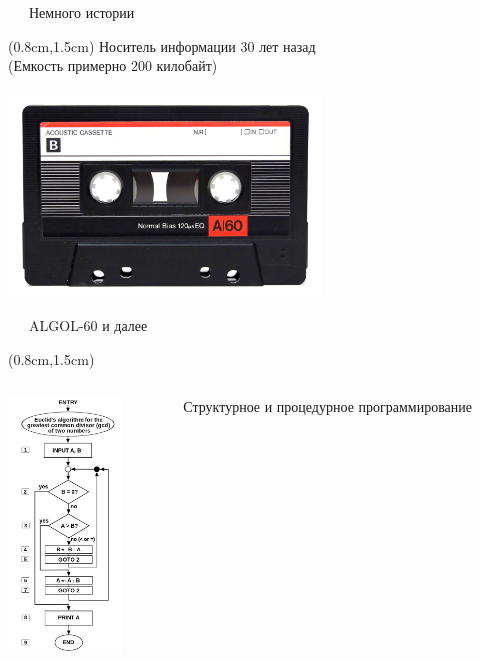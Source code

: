 \documentclass[xetex,18pt,aspectratio=43]{beamer}
\begin{document}
\begin{Large}
\begin{frame}{\ \ \ Немного истории}
\begin{textblock*}{\framewidth}(0.8cm,1.5cm)
Носитель информации 30 лет назад\\
{\small (Емкость примерно 200 килобайт)}
\begin{minipage}{\textwidth}
  \centering
  \includegraphics[height=5.5cm]{img/cassette}
\end{minipage}
\end{textblock*}
\end{frame}

\begin{frame}{\ \ \ ALGOL-60 и далее}
\begin{textblock*}{\framewidth}(0.8cm,1.5cm)
  \begin{columns}[onlytextwidth,t]
    \begin{column}{0.5\textwidth}
      \centering
      \includegraphics[height=6.8cm,valign=t]{img/algorithm}
    \end{column}
    \begin{column}{0.5\textwidth}
    Структурное и процедурное программирование
    \end{column}
  \end{columns}
\end{textblock*}
\end{frame}


\end{Large}
\end{document}
